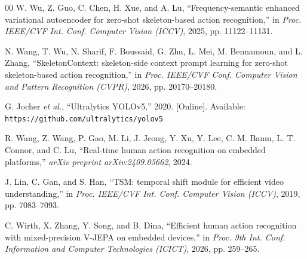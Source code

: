 \documentclass[conference]{IEEEtran}
\begin{document}
\begin{thebibliography}{00}
W. Wu, Z. Guo, C. Chen, H. Xue, and A. Lu,
``Frequency-semantic enhanced variational autoencoder for zero-shot skeleton-based action recognition,''
in \textit{Proc. IEEE/CVF Int. Conf. Computer Vision (ICCV)}, 2025, pp. 11122--11131.

N. Wang, T. Wu, N. Sharif, F. Boussaid, G. Zhu, L. Mei, M. Bennamoun, and L. Zhang,
``SkeletonContext: skeleton-side context prompt learning for zero-shot skeleton-based action recognition,''
in \textit{Proc. IEEE/CVF Conf. Computer Vision and Pattern Recognition (CVPR)}, 2026, pp. 20170--20180.

G. Jocher \textit{et al.},
``Ultralytics YOLOv5,'' 2020. [Online]. Available: \texttt{https://github.com/ultralytics/yolov5}

R. Wang, Z. Wang, P. Gao, M. Li, J. Jeong, Y. Xu, Y. Lee, C. M. Baum, L. T. Connor, and C. Lu,
``Real-time human action recognition on embedded platforms,''
\textit{arXiv preprint arXiv:2409.05662}, 2024.

J. Lin, C. Gan, and S. Han,
``TSM: temporal shift module for efficient video understanding,''
in \textit{Proc. IEEE/CVF Int. Conf. Computer Vision (ICCV)}, 2019, pp. 7083--7093.

C. Wirth, X. Zhang, Y. Song, and B. Dina,
``Efficient human action recognition with mixed-precision V-JEPA on embedded devices,''
in \textit{Proc. 9th Int. Conf. Information and Computer Technologies (ICICT)}, 2026, pp. 259--265.

\end{thebibliography}
\end{document}
